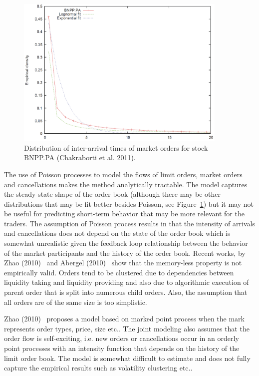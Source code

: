 	\begin{figure}[!ht]
   	\centering
   	\includegraphics[width=0.9\textwidth]{chapters/chapter_el_exch/figures/intertime.png} 
   	\caption{Distribution of inter-arrival times of market orders for stock BNPP.PA (Chakraborti et al. 2011). \label{fig:intertimefig}}
	\end{figure}

The use of Poisson processes to model the flows of limit orders, market orders and cancellations makes the method analytically tractable. The model captures the steady-state shape of the order book (although there may be other distributions that may be fit better besides Poisson, see Figure~\ref{fig:intertimefig}) but it may not be useful for predicting short-term behavior that may be more relevant for the traders. The assumption of Poisson process results in that the intensity of arrivals and cancellations does not depend on the state of the order book which is somewhat unrealistic given the feedback loop relationship between the behavior of the market participants and the history of the order book. Recent works, by Zhao (2010)~\cite{} and Abergel (2010)~\cite{} show that the memory-less property is not empirically valid. Orders tend to be clustered due to dependencies between liquidity taking and liquidity providing and also due to algorithmic execution of parent order that is split into numerous child orders. Also, the assumption that all orders are of the same size is too simplistic. 


Zhao (2010)~\cite{} proposes a model based on marked point process when the mark represents order types, price, size etc.. The joint modeling also assumes that the order flow is self-exciting, i.e. new orders or cancellations occur in an orderly point processes with an intensity function that depends on the history of the limit order book. The model is somewhat difficult to estimate and does not fully capture the empirical results such as volatility clustering etc.. \\

